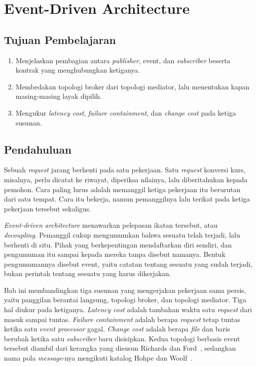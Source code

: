 \chapter{Event-Driven Architecture}
\label{bab:event}

\section*{Tujuan Pembelajaran}

\begin{enumerate}
  \item Menjelaskan pembagian antara \textit{publisher}, event, dan \textit{subscriber} beserta
    kontrak yang menghubungkan ketiganya.
  \item Membedakan topologi broker dari topologi mediator, lalu menentukan
    kapan masing-masing layak dipilih.
  \item Mengukur \textit{latency cost}, \textit{failure containment}, dan
    \textit{change cost} pada ketiga susunan.
\end{enumerate}

\section{Pendahuluan}

Sebuah \textit{request} jarang berhenti pada satu pekerjaan. Satu \textit{request} konversi
kurs, misalnya, perlu dicatat ke riwayat, diperiksa nilainya, lalu
diberitahukan kepada pemohon. Cara paling lurus adalah memanggil ketiga
pekerjaan itu berurutan dari satu tempat. Cara itu bekerja, namun pemanggilnya
lalu terikat pada ketiga pekerjaan tersebut sekaligus.

\textit{Event-driven
architecture}
menawarkan pelepasan ikatan tersebut, atau
\textit{decoupling}.
Pemanggil cukup mengumumkan bahwa sesuatu telah terjadi, lalu berhenti di situ.
Pihak yang berkepentingan mendaftarkan diri sendiri, dan pengumuman itu
sampai kepada mereka tanpa disebut namanya. Bentuk pengumumannya disebut event,
yaitu catatan tentang sesuatu yang sudah terjadi, bukan perintah tentang
sesuatu yang harus dikerjakan.

Bab ini membandingkan tiga susunan yang mengerjakan pekerjaan sama persis,
yaitu panggilan berantai langsung, topologi broker, dan topologi
mediator.
Tiga hal diukur pada ketiganya. \textit{Latency cost} adalah tambahan waktu satu
\textit{request} dari masuk sampai tuntas. \textit{Failure containment} adalah
berapa \textit{request} tetap tuntas ketika satu \textit{event
processor} gagal.
\textit{Change cost} adalah berapa \textit{file} dan baris berubah ketika satu
\textit{subscriber} baru disisipkan. Kedua
topologi berbasis event tersebut
diambil dari kerangka yang disusun
Richards dan Ford~\cite{richards2020fundamentals}, sedangkan nama pola
\textit{message}-nya mengikuti katalog Hohpe dan Woolf~\cite{hohpe2003eip}.

